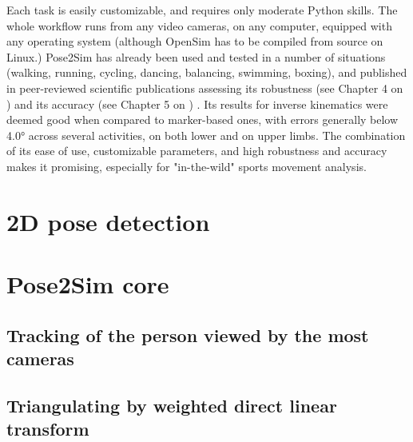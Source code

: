 
Each task is easily customizable, and requires only moderate Python skills. The whole workflow runs from any video cameras, on any computer, equipped with any operating system (although OpenSim has to be compiled from source on Linux.) Pose2Sim has already been used and tested in a number of situations (walking, running, cycling, dancing, balancing, swimming, boxing), and published in peer-reviewed scientific publications assessing its robustness (see Chapter 4 on ) \cite{Pagnon2021} and its accuracy (see Chapter 5 on ) \cite{Pagnon2022a}. Its results for inverse kinematics were deemed good when compared to marker-based ones, with errors generally below 4.0° across several activities, on both lower and on upper limbs. The combination of its ease of use, customizable parameters, and high robustness and accuracy makes it promising, especially for "in-the-wild" sports movement analysis.


\section{2D pose detection}



\section{Pose2Sim core}
\subsection{Tracking of the person viewed by the most cameras}
\blindtext

\subsection{Triangulating by weighted direct linear transform}



